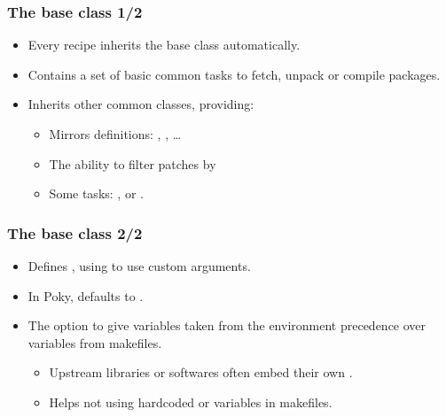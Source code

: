 \begin{frame}
  \frametitle{The base class 1/2}
  \begin{itemize}
    \item Every recipe inherits the base class automatically.
    \item Contains a set of basic common tasks to fetch, unpack or
          compile packages.
    \item Inherits other common classes, providing:
    \begin{itemize}
      \item Mirrors definitions: ,
            , \dots
      \item The ability to filter patches by 
      \item Some tasks: ,  or
            .
    \end{itemize}
  \end{itemize}
\end{frame}

\begin{frame}
  \frametitle{The base class 2/2}
  \begin{itemize}
    \item Defines , using  to use
      custom arguments.
    \item In Poky,  defaults to .
    \item The  option to give variables taken from the
      environment precedence over variables from makefiles.
      \begin{itemize}
        \item Upstream libraries or softwares often embed their own
          .
        \item Helps not using hardcoded  or 
          variables in makefiles.
      \end{itemize}
  \end{itemize}
\end{frame}

